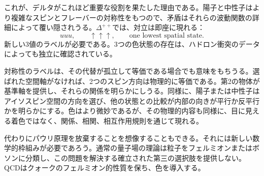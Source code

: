 
\begin{classroomqa}
\end{classroomqa}

これが、デルタがこれほど重要な役割を果たした理由である。陽子と中性子はより複雑なスピンとフレーバーの対称性をもつので、矛盾はそれらの波動関数の詳細によって覆い隠されうる。\(\Delta^{++}\)では、対立は即座に現れる：
\begin{equation}
uuu,\qquad
\uparrow\uparrow\uparrow,
\qquad
\text{one lowest spatial state}.
\end{equation}
新しい3値のラベルが必要である。3つの色状態の存在は、ハドロン衝突のデータによっても独立に確認されている。

対称性のラベルは、その代替が孤立して等価である場合でも意味をもちうる。選ばれた空間軸がなければ、2つのスピン方向は物理的に等価である。第2の物体が基準軸を提供し、それらの関係を明らかにしうる。同様に、陽子または中性子はアイソスピン空間の方向を選び、他の状態との比較が内部の向きが平行か反平行かを明らかにする。色はより微妙であるが、その物理的内容も同様に、目に見える着色ではなく、関係、相関、相互作用規則を通じて現れる。

代わりにパウリ原理を放棄することを想像することもできる。それには新しい数学的枠組みが必要であろう。通常の量子場の理論は粒子をフェルミオンまたはボソンに分類し、この問題を解決する確立された第三の選択肢を提供しない。QCDはクォークのフェルミオン的性質を保ち、色を導入する。

\begin{classroomqa}
\end{classroomqa}

\begin{classroomqa}
\end{classroomqa}

